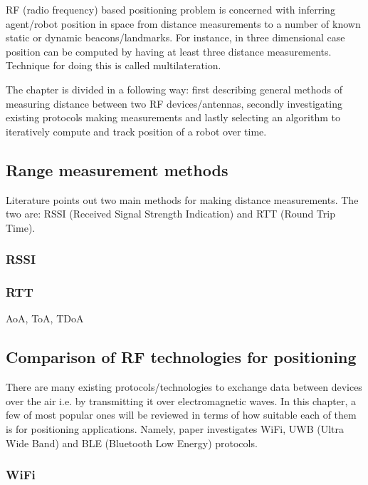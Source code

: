 
RF (radio frequency) based positioning problem is concerned with inferring agent/robot position in space from distance measurements to a number of known static or dynamic beacons/landmarks. For instance, in three dimensional case position can be computed by having at least three distance measurements. Technique for doing this is called multilateration.

The chapter is divided in a following way: first describing general methods of measuring distance between two RF devices/antennas, secondly investigating existing protocols making measurements and lastly selecting an algorithm to iteratively compute and track position of a robot over time.

\subsection{Range measurement methods}

Literature points out two main methods for making distance measurements. The two are: RSSI (Received Signal Strength Indication) and RTT (Round Trip Time).

\subsubsection{RSSI}

\subsubsection{RTT}
AoA, ToA, TDoA


\subsection{Comparison of RF technologies for positioning}

There are many existing protocols/technologies to exchange data between devices over the air i.e. by transmitting it over electromagnetic waves. In this chapter, a few of most popular ones will be reviewed in terms of how suitable each of them is for positioning applications. Namely, paper investigates WiFi, UWB (Ultra Wide Band) and BLE (Bluetooth Low Energy) protocols.

\subsubsection{WiFi}

